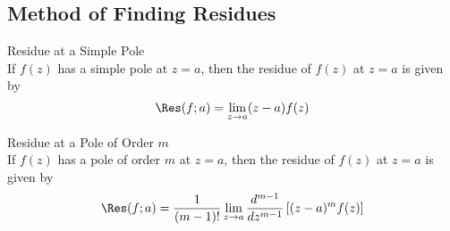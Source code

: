 \subsection{Method of Finding Residues}
\begin{theorem}{Residue at a Simple Pole}{}
    \\If $f(z)$ has a simple pole at $z=a$, then the residue of $f(z)$ at $z=a$ is given by
    \[ \Res(f;a) = \lim_{z \to a} (z-a)f(z) \]
\end{theorem}

\begin{theorem}{Residue at a Pole of Order $m$}{}
    \\If $f(z)$ has a pole of order $m$ at $z=a$, then the residue of $f(z)$ at $z=a$ is given by
    \[ \Res(f;a) = \frac{1}{(m-1)!} \lim_{z \to a} \frac{d^{m-1}}{dz^{m-1}} \left[ (z-a)^m f(z) \right] \]
\end{theorem}
